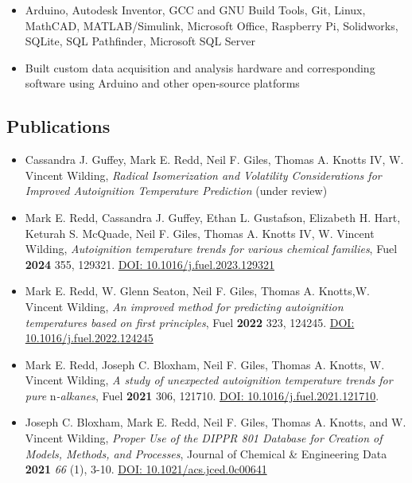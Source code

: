 \begin{itemize}
\tightlist
\item
  Arduino, Autodesk Inventor, GCC and GNU Build Tools, Git, Linux,
  MathCAD, MATLAB/Simulink, Microsoft Office, Raspberry Pi, Solidworks,
  SQLite, SQL Pathfinder, Microsoft SQL Server
\item
  Built custom data acquisition and analysis hardware and corresponding
  software using Arduino and other open-source platforms
\end{itemize}

\subsection{Publications}\label{publications}


\begin{itemize}
\item
  Cassandra J. Guffey, Mark E. Redd, Neil F. Giles, Thomas A. Knotts IV,
  W. Vincent Wilding, \emph{Radical Isomerization and Volatility
  Considerations for Improved Autoignition Temperature Prediction}
  (under review)
\item
  Mark E. Redd, Cassandra J. Guffey, Ethan L. Gustafson, Elizabeth H.
  Hart, Keturah S. McQuade, Neil F. Giles, Thomas A. Knotts IV, W.
  Vincent Wilding, \emph{Autoignition temperature trends for various
  chemical families}, Fuel \textbf{2024} 355, 129321.
  \href{https://doi.org/10.1016/j.fuel.2023.129321}{DOI:
  10.1016/j.fuel.2023.129321}
\item
  Mark E. Redd, W. Glenn Seaton, Neil F. Giles, Thomas A. Knotts,W.
  Vincent Wilding, \emph{An improved method for predicting autoignition
  temperatures based on first principles}, Fuel \textbf{2022} 323,
  124245. \href{https://doi.org/10.1016/j.fuel.2022.124245}{DOI:
  10.1016/j.fuel.2022.124245}
\item
  Mark E. Redd, Joseph C. Bloxham, Neil F. Giles, Thomas A. Knotts, W.
  Vincent Wilding, \emph{A study of unexpected autoignition temperature
  trends for pure} n\emph{-alkanes}, Fuel \textbf{2021} 306, 121710.
  \href{https://doi.org/10.1016/j.fuel.2021.121710}{DOI:
  10.1016/j.fuel.2021.121710}.
\item
  Joseph C. Bloxham, Mark E. Redd, Neil F. Giles, Thomas A. Knotts, and
  W. Vincent Wilding, \emph{Proper Use of the DIPPR 801 Database for
  Creation of Models, Methods, and Processes}, Journal of Chemical \&
  Engineering Data \textbf{2021} \emph{66} (1), 3-10.
  \href{https://doi.org/10.1021/acs.jced.0c00641}{DOI:
  10.1021/acs.jced.0c00641}
\end{itemize}

